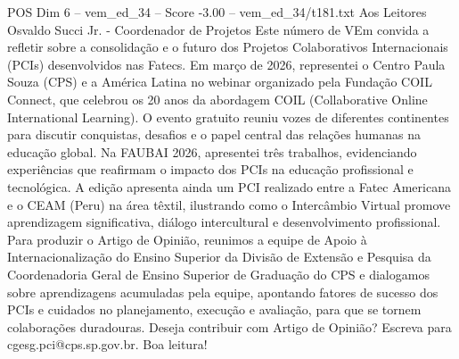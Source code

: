 \begin{textsample}{POS Dim 6 – vem\_ed\_34 – Score -3.00 – vem\_ed\_34/t181.txt}  \label{ex:f6_pos_160}
Aos Leitores Osvaldo Succi Jr. - Coordenador de Projetos Este número de VEm convida a refletir sobre a consolidação e o futuro dos Projetos Colaborativos Internacionais (PCIs) desenvolvidos nas Fatecs.
Em março de 2026, representei o Centro Paula Souza (CPS) e a América Latina no webinar organizado pela Fundação COIL Connect, que celebrou os 20 anos da abordagem COIL (Collaborative Online International Learning).
O evento gratuito reuniu vozes de diferentes continentes para discutir conquistas, desafios e o papel central das relações humanas na educação global.
Na FAUBAI 2026, apresentei três trabalhos, evidenciando experiências que reafirmam o impacto dos PCIs na educação profissional e tecnológica.
A edição apresenta ainda um PCI realizado entre a Fatec Americana e o CEAM (Peru) na área têxtil, ilustrando como o Intercâmbio Virtual promove aprendizagem significativa, diálogo intercultural e desenvolvimento profissional.
Para produzir o Artigo de Opinião, reunimos a equipe de Apoio à Internacionalização do Ensino Superior da Divisão de Extensão e Pesquisa da Coordenadoria Geral de Ensino Superior de Graduação do CPS e dialogamos sobre aprendizagens acumuladas pela equipe, apontando fatores de sucesso dos PCIs e cuidados no planejamento, execução e avaliação, para que se tornem colaborações duradouras.
Deseja contribuir com Artigo de Opinião?
Escreva para cgesg.pci@cps.sp.gov.br.
Boa leitura!

\end{textsample}
